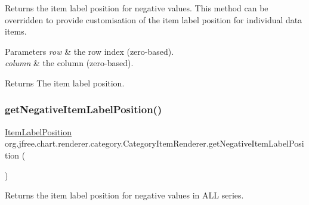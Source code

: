 Returns the item label position for negative values. This method can be overridden to provide customisation of the item label position for individual data items.


\begin{DoxyParams}{Parameters}
{\em row} & the row index (zero-\/based). \\
\hline
{\em column} & the column (zero-\/based).\\
\hline
\end{DoxyParams}
\begin{DoxyReturn}{Returns}
The item label position. 
\end{DoxyReturn}
\mbox{\label{interfaceorg_1_1jfree_1_1chart_1_1renderer_1_1category_1_1_category_item_renderer_a3e5a51575b8547693b2ad6a91d2a1fce}} 
\subsubsection{\texorpdfstring{get\+Negative\+Item\+Label\+Position()}{getNegativeItemLabelPosition()}\hspace{0.1cm}{\footnotesize\ttfamily [2/2]}}
{\footnotesize\ttfamily \mbox{\hyperlink{classorg_1_1jfree_1_1chart_1_1labels_1_1_item_label_position}{Item\+Label\+Position}} org.\+jfree.\+chart.\+renderer.\+category.\+Category\+Item\+Renderer.\+get\+Negative\+Item\+Label\+Position (\begin{DoxyParamCaption}{ }\end{DoxyParamCaption})}

Returns the item label position for negative values in A\+LL series.

